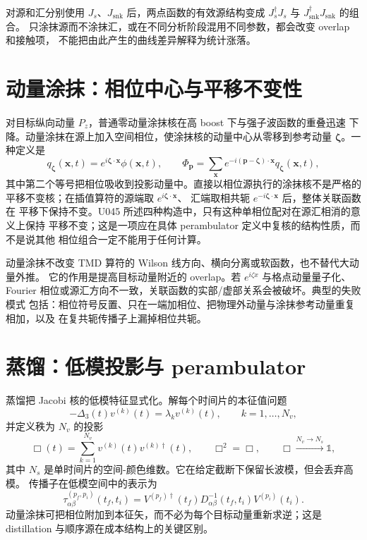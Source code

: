 对源和汇分别使用 \(J_s\)、\(J_{\mathrm{snk}}\) 后，两点函数的有效源结构变成
\(J_s^\dagger J_s\) 与 \(J_{\mathrm{snk}}^\dagger J_{\mathrm{snk}}\) 的组合。
只涂抹源而不涂抹汇，或在不同分析阶段混用不同参数，都会改变 overlap 和接触项，
不能把由此产生的曲线差异解释为统计涨落。

\section{动量涂抹：相位中心与平移不变性}

对目标纵向动量 \(P_z\)，普通零动量涂抹核在高 boost 下与强子波函数的重叠迅速
下降。动量涂抹在源上加入空间相位，使涂抹核的动量中心从零移到参考动量
\(\boldsymbol{\zeta}\)。一种定义是
\begin{equation}
  q_{\boldsymbol{\zeta}}(\boldsymbol{x},t)
  =e^{i\boldsymbol{\zeta}\cdot\boldsymbol{x}}\phi(\boldsymbol{x},t),
  \qquad
  \Phi_{\boldsymbol p}
  =\sum_{\boldsymbol{x}} e^{-i(\boldsymbol p-\boldsymbol{\zeta})\cdot\boldsymbol{x}}
  q_{\boldsymbol{\zeta}}(\boldsymbol{x},t),
  \label{eq:b03-momentum-smear}
\end{equation}
其中第二个等号把相位吸收到投影动量中。直接以相位源执行的涂抹核不是严格的
平移不变核；在插值算符的源端取 \(e^{i\boldsymbol{\zeta}\cdot\boldsymbol{x}}\)、
汇端取相共轭 \(e^{-i\boldsymbol{\zeta}\cdot\boldsymbol{x}}\) 后，整体关联函数在
平移下保持不变。U045 所述四种构造中，只有这种单相位配对在源汇相消的意义上保持
平移不变；这是一项应在具体 perambulator 定义中复核的结构性质，而不是说其他
相位组合一定不能用于任何计算。

动量涂抹不改变 TMD 算符的 Wilson 线方向、横向分离或软函数，也不替代大动量外推。
它的作用是提高目标动量附近的 overlap。若 \(e^{i\zeta x}\) 与格点动量量子化、
Fourier 相位或源汇方向不一致，关联函数的实部/虚部关系会被破坏。典型的失败模式
包括：相位符号反置、只在一端加相位、把物理外动量与涂抹参考动量重复相加，以及
在复共轭传播子上漏掉相位共轭。

\section{蒸馏：低模投影与 perambulator}

蒸馏把 Jacobi 核的低模特征显式化。解每个时间片的本征值问题
\begin{equation}
  -\Delta_3(t)v^{(k)}(t)=\lambda_k v^{(k)}(t),
  \qquad k=1,\ldots,N_v,
  \label{eq:b03-distill-eigen}
\end{equation}
并定义秩为 \(N_v\) 的投影
\begin{equation}
  \Box(t)=\sum_{k=1}^{N_v}v^{(k)}(t)v^{(k)\dagger}(t),
  \qquad
  \Box^2=\Box,\qquad \Box\xrightarrow{N_v\to N_s}\mathbb 1 ,
  \label{eq:b03-distill-projector}
\end{equation}
其中 \(N_s\) 是单时间片的空间-颜色维数。它在给定截断下保留长波模，但会丢弃高模。
传播子在低模空间中的表示为
\begin{equation}
  \tau_{\alpha\beta}^{(p_f,p_i)}(t_f,t_i)
  =V^{(p_f)\dagger}(t_f)D_{\alpha\beta}^{-1}(t_f,t_i)V^{(p_i)}(t_i).
  \label{eq:b03-perambulator}
\end{equation}
动量涂抹可把相位附加到本征矢，而不必为每个目标动量重新求逆；这是
distillation 与顺序源在成本结构上的关键区别。


